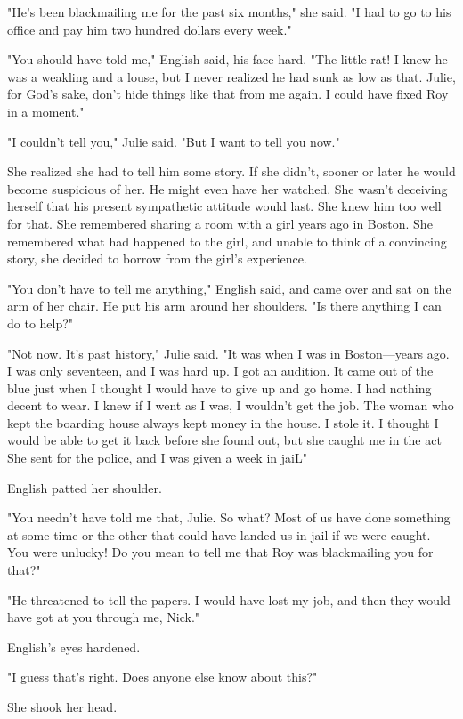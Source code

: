 \documentclass{novel}
\begin{document}
"He's been blackmailing me for the past six months," she said. "I had to go to his office and pay him two hundred dollars every week."

"You should have told me," English said, his face hard. "The little rat! I knew he was a weakling and a louse, but I never realized he had sunk as low as that. Julie, for God's sake, don't hide things like that from me again. I could have fixed Roy in a moment."

"I couldn't tell you," Julie said. "But I want to tell you now."

She realized she had to tell him some story. If she didn't, sooner or later he would become suspicious of her. He might even have her watched. She wasn't deceiving herself that his present sympathetic attitude would last. She knew him too well for that. She remembered sharing a room with a girl years ago in Boston. She remembered what had happened to the girl, and unable to think of a convincing story, she decided to borrow from the girl's experience.

"You don't have to tell me anything," English said, and came over and sat on the arm of her chair. He put his arm around her shoulders. "Is there anything I can do to help?"

"Not now. It's past history," Julie said. "It was when I was in Boston—years ago. I was only seventeen, and I was hard up. I got an audition. It came out of the blue just when I thought I would have to give up and go home. I had nothing decent to wear. I knew if I went as I was, I wouldn't get the job. The woman who kept the boarding house always kept money in the house. I stole it. I thought I would be able to get it back before she found out, but she caught me in the act She sent for the police, and I was given a week in jaiL"

English patted her shoulder.

"You needn't have told me that, Julie. So what? Most of us have done something at some time or the other that could have landed us in jail if we were caught. You were unlucky! Do you mean to tell me that Roy was blackmailing you for that?"

"He threatened to tell the papers. I would have lost my job, and then they would have got at you through me, Nick."

English's eyes hardened.

"I guess that's right. Does anyone else know about this?"

She shook her head.
\end{document}
